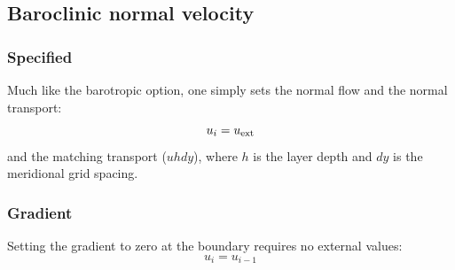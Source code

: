 \documentclass[11pt]{article}
\begin{document}
\subsection{Baroclinic normal velocity}
\subsubsection{Specified}
Much like the barotropic option, one simply sets the normal flow
and the normal transport:
\begin{equation}
  u_{i} = u_{\rm ext}
\end{equation}
and the matching transport ($u h dy$),
where $h$ is the layer depth and $dy$ is the meridional grid
spacing.

\subsubsection{Gradient}
Setting the gradient to zero at the boundary requires no
external values:
\begin{equation}
  u_{i} = u_{i-1}
\end{equation}
\end{document}
